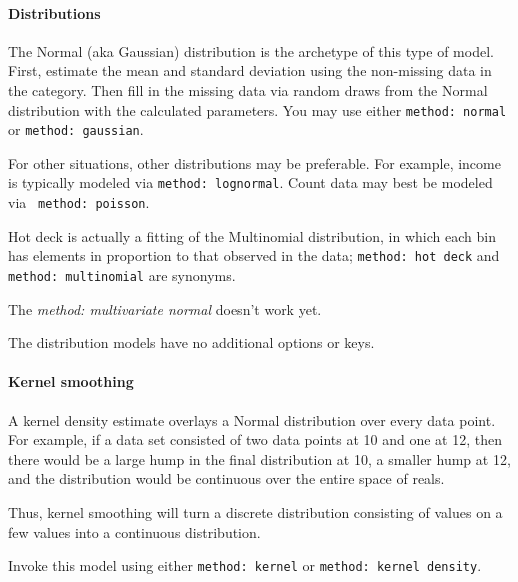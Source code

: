 \documentclass{article}
\begin{document}
\paragraph{Distributions} The Normal (aka Gaussian) distribution is the archetype of this
type of model. First, estimate the mean and standard deviation using the non-missing data
in the category. Then fill in the missing data via random draws from the Normal
distribution with the calculated parameters. You may use either {\tt method: normal} or
{\tt method: gaussian}.

For other situations, other distributions may be preferable. For example, income is
typically modeled via {\tt method: lognormal}. Count data may best be modeled via {\tt
method: poisson}.

Hot deck is actually a fitting of the Multinomial distribution, in which each bin has
elements in proportion to that observed in the data; {\tt method: hot deck} and {\tt
method: multinomial} are synonyms.

The {\em method: multivariate normal} doesn't work yet.

The distribution models have no additional options or keys.

\paragraph{Kernel smoothing} A kernel density estimate overlays a Normal distribution over
every data point. For example, if a data set consisted of two data points at 10 and one at
12, then there would be a large hump in the final distribution at 10, a smaller hump at
12, and the distribution would be continuous over the entire space of reals.

Thus, kernel smoothing will turn a discrete distribution consisting of values on a
few values into a continuous distribution.

Invoke this model using either {\tt method: kernel} or {\tt method: kernel density}.

\end{document}
